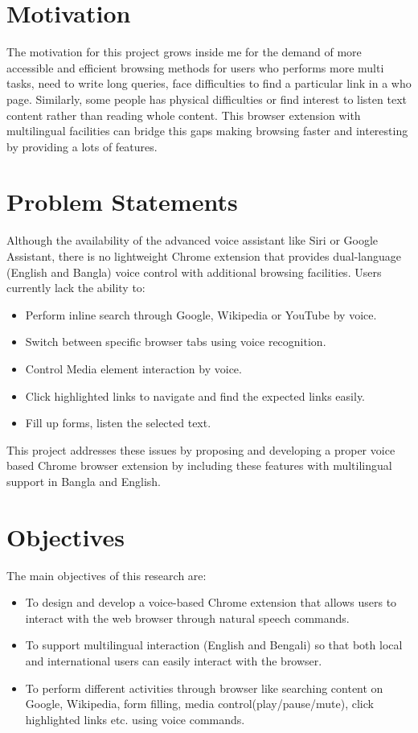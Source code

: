 	
	\section{Motivation}
	The motivation for this project grows inside me for the demand of more accessible and efficient browsing methods  for users who performs more multi tasks, need to write long queries, face difficulties to find a particular link in a who page. Similarly, some people has physical difficulties or find interest to listen text content rather than reading whole content. This browser extension with multilingual facilities can bridge this gaps making browsing faster and interesting by providing a lots of features. 
	
	\section{Problem Statements}
	Although the availability of the advanced voice assistant like Siri or
	Google Assistant, there is no lightweight Chrome extension that provides dual-language (English and Bangla) voice control with additional browsing facilities. Users currently lack the ability to:
	\begin{itemize}
		\item	Perform inline search through Google, Wikipedia or YouTube by voice.
		\item	Switch between specific browser tabs using voice recognition.
		\item   Control Media element interaction by voice.
		\item	Click highlighted links to navigate and find the expected links easily.
		\item	Fill up forms, listen the selected text.
	\end{itemize}
	
	This project addresses these issues by proposing and developing a proper voice based Chrome browser extension by including these features with multilingual support in Bangla and English.
	
	
	\section{Objectives}
	The main objectives of this research are:
	\begin{itemize}
		\item To design and develop a voice-based Chrome extension that allows users to interact with the web browser through natural speech commands.
		\item To support multilingual interaction (English and Bengali) so that both local and international users can easily interact with the browser.
		\item To perform different activities through browser like searching content on Google, Wikipedia, form filling, media control(play/pause/mute), click highlighted links etc. using voice commands.
	\end{itemize}
